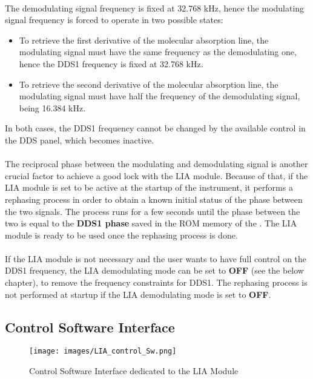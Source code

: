 \paragraph{} The demodulating signal frequency is fixed at 32.768 kHz, hence the modulating signal frequency is forced to operate in two possible states:
\begin{itemize}
    \item To retrieve the first derivative of the molecular absorption line, the modulating signal must have the same frequency as the demodulating one, hence the DDS1 frequency is fixed at 32.768 kHz.
    
    \item To retrieve the second derivative of the molecular absorption line, the modulating signal must have half the frequency of the demodulating signal, being 16.384 kHz.
\end{itemize}
In both cases, the DDS1 frequency cannot be changed by the available control in the DDS panel, which becomes inactive.

\paragraph{} The reciprocal phase between the modulating and demodulating signal is another crucial factor to achieve a good lock with the LIA module. Because of that, if the LIA module is set to be active at the startup of the instrument, it performs a rephasing process in order to obtain a known initial status of the phase between the two signals. The process runs for a few seconds until the phase between the two is equal to the \textbf{DDS1 phase} saved in the ROM memory of the \QubeModel . The LIA module is ready to be used once the rephasing process is done.

\paragraph{} If the LIA module is not necessary and the user wants to have full control on the DDS1 frequency, the LIA demodulating mode can be set to \textbf{OFF} (see the below chapter), to remove the frequency constraints for DDS1. The rephasing process is not performed at startup if the LIA demodulating mode is set to \textbf{OFF}.
\newpage





\subsection{Control Software Interface} \label{LIA_SW_chapter}
\begin{figure}[h]
    \centering
    \texttt{[image: images/LIA\_control\_Sw.png]}
    \caption{Control Software Interface dedicated to the LIA Module}
    \label{LIA_SW_interface}
\end{figure}

